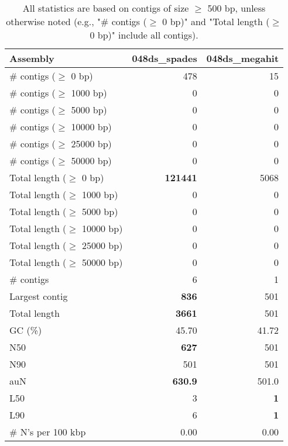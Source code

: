\documentclass[12pt,a4paper]{article}
\begin{document}
\begin{table}[ht]
\begin{center}
\caption{All statistics are based on contigs of size $\geq$ 500 bp, unless otherwise noted (e.g., "\# contigs ($\geq$ 0 bp)" and "Total length ($\geq$ 0 bp)" include all contigs).}
\begin{tabular}{|l*{2}{|r}|}
\hline
Assembly & 048ds\_spades & 048ds\_megahit \\ \hline
\# contigs ($\geq$ 0 bp) & 478 & 15 \\ \hline
\# contigs ($\geq$ 1000 bp) & 0 & 0 \\ \hline
\# contigs ($\geq$ 5000 bp) & 0 & 0 \\ \hline
\# contigs ($\geq$ 10000 bp) & 0 & 0 \\ \hline
\# contigs ($\geq$ 25000 bp) & 0 & 0 \\ \hline
\# contigs ($\geq$ 50000 bp) & 0 & 0 \\ \hline
Total length ($\geq$ 0 bp) & {\bf 121441} & 5068 \\ \hline
Total length ($\geq$ 1000 bp) & 0 & 0 \\ \hline
Total length ($\geq$ 5000 bp) & 0 & 0 \\ \hline
Total length ($\geq$ 10000 bp) & 0 & 0 \\ \hline
Total length ($\geq$ 25000 bp) & 0 & 0 \\ \hline
Total length ($\geq$ 50000 bp) & 0 & 0 \\ \hline
\# contigs & 6 & 1 \\ \hline
Largest contig & {\bf 836} & 501 \\ \hline
Total length & {\bf 3661} & 501 \\ \hline
GC (\%) & 45.70 & 41.72 \\ \hline
N50 & {\bf 627} & 501 \\ \hline
N90 & 501 & 501 \\ \hline
auN & {\bf 630.9} & 501.0 \\ \hline
L50 & 3 & {\bf 1} \\ \hline
L90 & 6 & {\bf 1} \\ \hline
\# N's per 100 kbp & 0.00 & 0.00 \\ \hline
\end{tabular}
\end{center}
\end{table}
\end{document}
